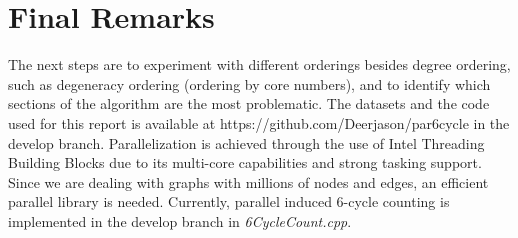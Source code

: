 \documentclass[11pt]{article}
\begin{document}
\section {Final Remarks}

The next steps are to experiment with different orderings besides degree ordering, such as degeneracy ordering (ordering by core numbers), and to identify which sections of the algorithm are the most problematic.
The datasets and the code used for this report is available at https://github.com/Deerjason/par6cycle in the develop branch.
Parallelization is achieved through the use of Intel Threading Building Blocks due to its multi-core capabilities and strong tasking support.
Since we are dealing with graphs with millions of nodes and edges, an efficient parallel library is needed.
Currently, parallel induced 6-cycle counting is implemented in the develop branch in \textit{6CycleCount.cpp}.

{}

\end{document}
